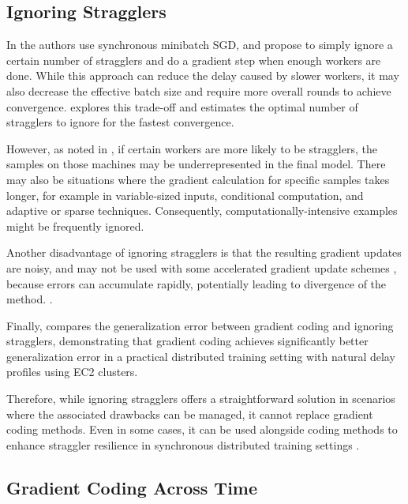 \subsection{Ignoring Stragglers}

In \cite{chen2016revisiting} the authors use synchronous minibatch SGD, and propose to simply ignore a certain number of stragglers and do a gradient step when enough workers are done.
While this approach can reduce the delay caused by slower workers, it may also decrease the effective batch size and require more overall rounds to achieve convergence. \cite{chen2016revisiting} explores this trade-off and estimates the optimal number of stragglers to ignore for the fastest convergence.

However, as noted in \cite{grad_coding}, if certain workers are more likely to be stragglers, the samples on those machines may be underrepresented in the final model. There may also be situations where the gradient calculation for specific samples takes longer, for example in variable-sized inputs, conditional computation, and adaptive or sparse techniques. Consequently, computationally-intensive examples might be frequently ignored.

Another disadvantage of ignoring stragglers is that the resulting gradient updates are noisy, and may not be used with some accelerated gradient update schemes \cite{grad_coding}, because errors can accumulate rapidly, potentially leading to divergence of the method. \cite{devolder2014first}. 

Finally, \cite{grad_coding} compares the generalization error between gradient coding and ignoring stragglers, demonstrating that gradient coding achieves significantly better generalization error in a practical distributed training setting with natural delay profiles using EC2 clusters.

Therefore, while ignoring stragglers offers a straightforward solution in scenarios where the associated drawbacks can be managed, it cannot replace gradient coding methods. Even in some cases, it can be used alongside coding methods to enhance straggler resilience in synchronous distributed training settings \cite{su2023arbitrary}.

\subsection{Gradient Coding Across Time}

